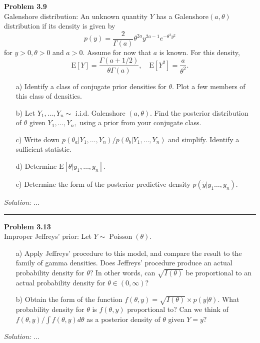 \documentclass[a4paper, 11pt]{article}
\newenvironment{problem}[2][Problem]
    { \begin{mdframed}[backgroundcolor=gray!20] \textbf{#1 #2} \\}
    {  \end{mdframed}}
\newenvironment{solution}
    {\textit{Solution:}}
    {}
\begin{document}
\begin{problem}{3.9}
Galenshore distribution: An unknown quantity $Y$ has a Galenshore$(a,\theta)$ distribution if its density is given by
$$
p(y)=\frac{2}{\Gamma(a)} \theta^{2 a} y^{2 a-1} e^{-\theta^{2} y^{2}}
$$
for $y>0, \theta>0$ and $a>0 .$ Assume for now that $a$ is known. For this density,
$$
\mathrm{E}[Y]=\frac{\Gamma(a+1 / 2)}{\theta \Gamma(a)}, \quad \mathrm{E}\left[Y^{2}\right]=\frac{a}{\theta^{2}}.
$$
\begin{enumerate}[leftmargin=*, parsep=0pt,itemsep=0pt, topsep=0pt]
	\item [a)] Identify a class of conjugate prior densities for $\theta .$ Plot a few members of this class of densities.
	\item[b)] Let $Y_{1}, \ldots, Y_{n} \sim$ i.i.d. Galenshore $(a, \theta) .$ Find the posterior distribution of $\theta$ given $Y_{1}, \ldots, Y_{n},$ using a prior from your conjugate class.
	\item[c)] Write down $p\left(\theta_{a} | Y_{1}, \ldots, Y_{n}\right) / p\left(\theta_{b} | Y_{1}, \ldots, Y_{n}\right)$ and simplify. Identify a sufficient statistic.
	\item[d)] Determine $\mathrm{E}[\theta | y_{1}, \ldots, y_{n}]$.
	\item[e)] Determine the form of the posterior predictive density $p(\tilde{y} | y_{1} \ldots, y_{n})$.
\end{enumerate}

\end{problem}
\begin{solution}
...
\end{solution} 

\noindent\rule{7in}{2.8pt}

\begin{problem}{3.13}
Improper Jeffreys' prior: Let $Y \sim \operatorname{Poisson}(\theta)$.
\begin{enumerate}[leftmargin=*, parsep=0pt,itemsep=0pt, topsep=0pt]
	\item [a)] Apply Jeffreys' procedure to this model, and compare the result to the family of gamma densities. Does Jeffreys' procedure produce an actual probability density for $\theta ?$ In other words, can $\sqrt{I(\theta)}$ be proportional to an actual probability density for $\theta \in(0, \infty) ?$
	\item[b)] Obtain the form of the function $f(\theta, y)=\sqrt{I(\theta)} \times p(y | \theta) .$ What probability density for $\theta$ is $f(\theta, y)$ proportional to? Can we think of $f(\theta, y) / \int f(\theta, y) d \theta$ as a posterior density of $\theta$ given $Y=y ?$
\end{enumerate}

\end{problem}
\begin{solution}
...

\end{solution} 
\end{document}
